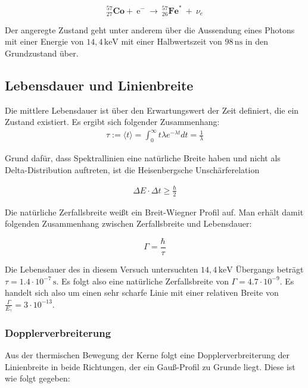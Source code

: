 \[ ^{57}_{27}\mathrm{\textbf{Co}} +\ \mathrm{e}^-\ \longrightarrow\ ^{57}_{26}\mathrm{\textbf{Fe}}^*\ +\ \nu_e\]


Der angeregte Zustand geht unter anderem über die Aussendung eines Photons mit einer Energie von $14,4\,\mathrm{keV}$ mit einer Halbwertszeit von $98\,\mathrm{ns}$ in den Grundzustand über.\cite{anleitung}

\subsection{Lebensdauer und Linienbreite}
\label{lebensdauer}
Die mittlere Lebensdauer ist über den Erwartungswert der Zeit definiert, die ein Zustand existiert. Es ergibt sich folgender Zusammenhang:
\begin{align}
\tau:=\langle t\rangle=\int_{0}^{\infty}t\lambda e^{-\lambda t}dt=\frac{1}{\lambda} 
\end{align}

Grund dafür, dass Spektrallinien eine natürliche Breite haben und nicht als Delta-Distribution auftreten, ist die Heisenbergsche Unschärferelation

\begin{align}
\Delta E\cdot\Delta t\geq\frac{\hbar}{2}
\end{align}


Die natürliche Zerfallsbreite weißt ein Breit-Wiegner Profil auf. Man erhält damit folgenden Zusammenhang zwischen Zerfallsbreite und Lebensdauer:

\[\Gamma=\frac{\hbar}{\tau}\]


Die Lebensdauer des in diesem Versuch untersuchten $14,4\,\mathrm{keV}$ Übergangs beträgt  $\tau = 1.4\cdot 10^{-7}\,\mathrm{s}$. Es folgt also eine natürliche Zerfallsbreite von $\Gamma = 4.7\cdot 10^{-9}$. Es handelt sich also um einen sehr scharfe Linie mit einer relativen Breite von $\frac{\Gamma}{E_{\gamma}}=3\cdot 10^{-13}$.\cite{jakobs}


\subsubsection{Dopplerverbreiterung}

Aus der thermischen Bewegung der Kerne folgt eine Dopplerverbreiterung der Linienbreite in beide Richtungen, der ein Gauß-Profil zu Grunde liegt. Diese ist wie folgt gegeben:


